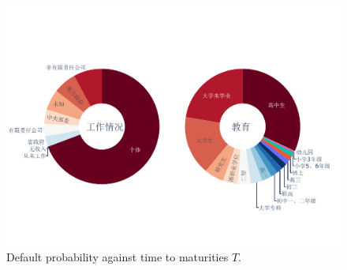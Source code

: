 \documentclass{article}
\begin{document}
\begin{figure}
	\begin{center}
		\makeatletter
		\def\@captype{figure}
		\makeatother
		\includegraphics[width=5.0in]{images/working_education.pdf}
		\caption{Default probability against time to maturities $T$. \label{DP}}
	\end{center}
\end{figure}
\end{document}

